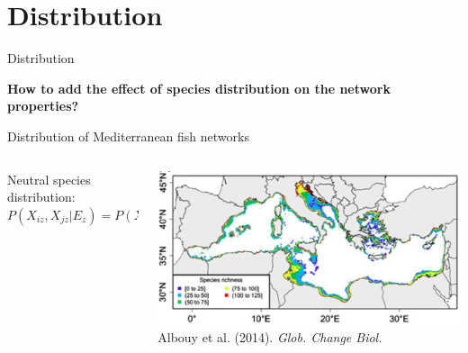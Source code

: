 \documentclass{eecslides}
\begin{document}

	\section{Distribution}


	\begin{frame}{Distribution}
		\begin{center}
			\alert{\textbf{How to add the effect of species distribution on the network properties?}}
		\end{center}
	\end{frame}


	\begin{frame}{Distribution of Mediterranean fish networks}
 	    	\begin{columns}
			\begin{column}{0.3\textwidth}							
				Neutral species distribution: \\
				$P(X_{iz},X_{jz}|E_z) = P(X_{iz}|E_z)P(X_{jz}|E_z)$
			\end{column}
			\begin{column}{0.7\textwidth}
				\includegraphics[height=0.4\textheight]{med_richness}\\
				\footnotesize{Albouy et al. (2014). \textit{Glob. Change Biol.}}
			\end{column}				
		\end{columns}	   
	\end{frame}

\end{document}
